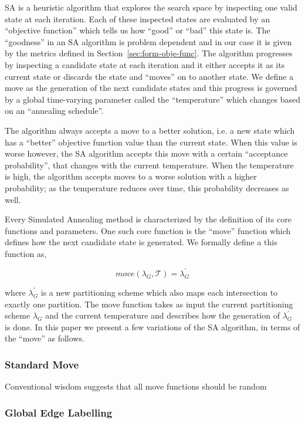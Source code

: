 SA is a heuristic algorithm that explores the search space by inspecting one valid state at each iteration. Each of these inspected states are evaluated by an ``objective function'' which tells us how ``good'' or ``bad'' this state is. The ``goodness'' in an SA algorithm is problem dependent and in our case it is given by the metrics defined in Section~\ref{sec:form-obje-func}. The algorithm progresses by inspecting a candidate state at each iteration and it either accepts it as its current state or discards the state and ``moves'' on to another state. We define a move as the generation of the next candidate states and this progress is governed by a global time-varying parameter called the ``temperature'' which changes based on an ``annealing schedule''.

The algorithm always accepts a move to a better solution, i.e. a new state which has a ``better'' objective function value than the current state. When this value is worse however, the SA algorithm accepts this move with a certain ``acceptance probability'', that changes with the current temperature. When the temperature is high, the algorithm accepts moves to a worse solution with a higher probability; as the temperature reduces over time, this probability decreases as well.

 Every Simulated Annealing method is characterized by the definition of its core functions and parameters. One such core function is the ``move'' function which defines how the next candidate state is generated. We formally define a this function as,

\begin{equation}
\label{eq:move-func}
move(\lambda_G, \mathcal{T}) =  \lambda_G^{'}
\end{equation}

\noindent where $\lambda_G^{'}$ is a new partitioning scheme which also maps each intersection to exactly one partition. The move function takes as input the current partitioning scheme $\lambda_G$ and the current temperature and describes how the generation of $\lambda_G^{'}$ is done. In this paper we present a few variations of the SA algorithm, in terms of the ``move'' as follows.

\subsubsection{Standard Move}
\label{sec:opti-std}
Conventional wisdom suggests that all move functions should be random 

\subsubsection{Global Edge Labelling}
\label{sec:opti-glob-edge}

